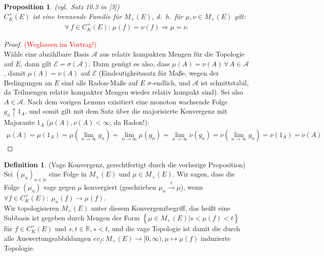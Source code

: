\documentclass[twoside]{article}
\newtheorem{proposition}[theorem]{Proposition}
\theoremstyle{definition}
\newtheorem{definition}[theorem]{Definition}
\begin{document}
\begin{proposition} (vgl.\ Satz 10.3 in [3])\\
$C_K^+(E)$ ist eine trennende Familie für $M_+(E)$, d.\ h.\ für $\mu, \nu \in M_+(E)$ gilt: 
\begin{align}
\forall \, f \in C_K^+(E) : \, \mu(f) = \nu(f) \Longrightarrow \mu = \nu.
\end{align}
\end{proposition}

\begin{proof} \textcolor{red}{(Weglassen im Vortrag!)}\\
Wähle eine abzählbare Basis $\mathcal{A}$ aus relativ kompakten Mengen für die Topologie auf $E$, dann gilt $\mathcal{E} = \sigma(\mathcal{A})$. Dann genügt es also, dass $\mu(A) = \nu(A) \, \forall \, A \in \mathcal{A}$, damit $\mu(A) = \nu(A)$ auf $\mathcal{E}$ (Eindeutigkeitssatz für Maße, wegen der Bedingungen an $E$ sind alle Radon-Maße auf $E$ $\sigma$-endlich, und $\mathcal{A}$ ist schnittstabil, da Teilmengen relativ kompakter Mengen wieder relativ kompakt sind). Sei also $A \in \mathcal{A}$. Nach dem vorigen Lemma exisitiert eine monoton wachsende Folge $g_n \uparrow 1_A$, und somit gilt mit dem Satz über die majorisierte Konvergenz mit Majorante $1_A$ ($\mu(A),\nu(A) < \infty$, da Radon!):
\begin{align}
\mu(A) = \mu(1_A) = \mu \left(\lim_{n \to \infty} g_n \right) =  \lim_{n \to \infty} \mu(g_n) = \lim_{n \to \infty} \nu(g_n)  = \nu \left(\lim_{n \to \infty} g_n \right) = \nu(1_A) = \nu(A)
\end{align}
\end{proof}
\begin{definition} 
(Vage Konvergenz, gerechtfertigt durch die vorherige Proposition)\\
Sei $(\mu_n)_{n \in \mathbb{N}}$ eine Folge in $M_+(E)$ und $\mu \in M_+(E)$. Wir sagen, dass die Folge $(\mu_n)$ vage gegen $\mu$ konvergiert (geschrieben $\mu_n \xrightarrow{v} \mu$), wenn
$
\forall f \in C_K^+(E): \; \mu_n(f) \xrightarrow{} \mu(f)
$.\\
Wir topologisieren $M_+(E)$ unter diesem Konvergenzbegriff, das heißt eine Subbasis ist gegeben durch Mengen der Form $\left\{\mu \in M_+(E) | s < \mu(f) < t \right\}$ für $f \in C_K^+(E)$ und $s,t \in \mathbb{R}, s < t$, und die vage Topologie ist damit die durch alle Auswertungsabbildungen $ev_f:M_+(E) \to [0,\infty), \mu \mapsto \mu(f)$ induzierte Topologie.
\end{definition}
\end{document}
